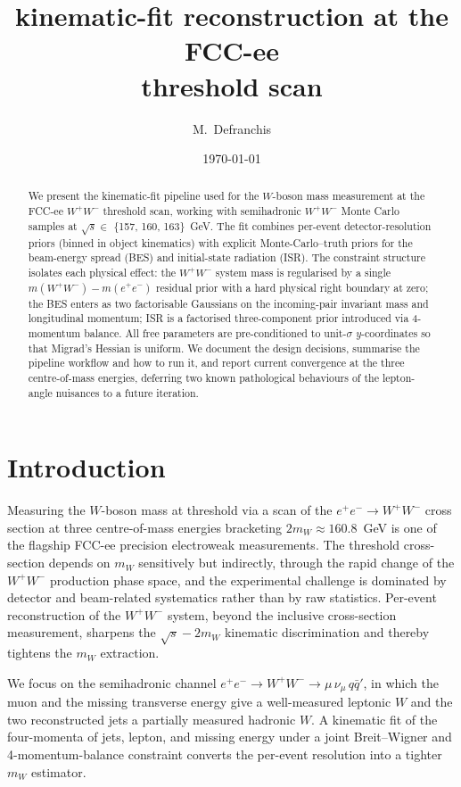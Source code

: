 \documentclass[11pt,a4paper]{article}
\title{\WW kinematic-fit reconstruction at the FCC-ee\\threshold scan}
\author{M.\ Defranchis}
\date{\today}
\newcommand{\sqs}{\ensuremath{\sqrt{s}}\xspace}
\newcommand{\mW}{\ensuremath{m_W}\xspace}
\newcommand{\WW}{\ensuremath{W^+W^-}\xspace}
\begin{document}
\maketitle

\begin{abstract}
\noindent
We present the kinematic-fit pipeline used for the $W$-boson mass
measurement at the FCC-ee \WW threshold scan, working with semihadronic
\WW Monte Carlo samples at \sqs $\in$ \{157, 160, 163\}~GeV. The fit
combines per-event detector-resolution priors (binned in object
kinematics) with explicit Monte-Carlo--truth priors for the beam-energy
spread (BES) and initial-state radiation (ISR). The constraint
structure isolates each physical effect: the \WW system mass is
regularised by a single $m(\WW)-m(e^+e^-)$ residual prior with a hard
physical right boundary at zero; the BES enters as two factorisable
Gaussians on the incoming-pair invariant mass and longitudinal
momentum; ISR is a factorised three-component prior introduced via
4-momentum balance. All free parameters are pre-conditioned to
unit-$\sigma$ $y$-coordinates so that Migrad's Hessian is uniform.
We document the design decisions, summarise the pipeline workflow and
how to run it, and report current convergence at the three
centre-of-mass energies, deferring two known pathological behaviours of
the lepton-angle nuisances to a future iteration.
\end{abstract}

\tableofcontents
\bigskip


\section{Introduction}\label{sec:intro}

Measuring the $W$-boson mass at threshold via a scan of the
$e^+e^-\to\WW$ cross section at three centre-of-mass energies bracketing
$2\mW \approx 160.8$~GeV is one of the flagship FCC-ee precision
electroweak measurements. The threshold cross-section depends on \mW
sensitively but indirectly, through the rapid change of the \WW
production phase space, and the experimental challenge is dominated by
detector and beam-related systematics rather than by raw statistics.
Per-event reconstruction of the \WW system, beyond the inclusive
cross-section measurement, sharpens the $\sqrt{s}-2\mW$ kinematic
discrimination and thereby tightens the \mW extraction.

We focus on the semihadronic channel
$e^+e^-\to W^+W^- \to \mu\,\nu_\mu\, q\bar{q}'$, in which the muon and
the missing transverse energy give a well-measured leptonic $W$ and the
two reconstructed jets a partially measured hadronic $W$. A kinematic
fit of the four-momenta of jets, lepton, and missing energy under a
joint Breit--Wigner and 4-momentum-balance constraint converts the
per-event resolution into a tighter \mW estimator.
\end{document}
